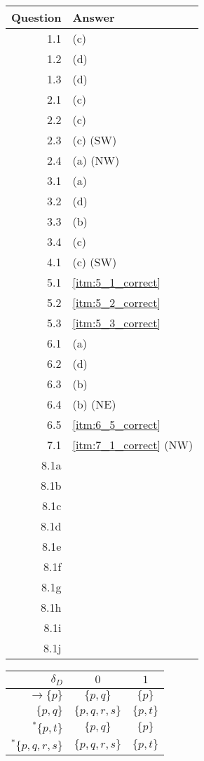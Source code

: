 \documentclass[docid=2012]{tcom_test1}
\begin{document}
\renewcommand\thesubsubsection{\thesubsection.\arabic{subsubsection}}
\setcounter{chapter}{2011}
\begin{center}
\begin{tabular}{r | l}
	Question & Answer   \\ \hline
	1.1      & (c)      \\
	1.2      & (d)      \\
	1.3      & (d)      \\ \hline
	2.1      & (c)      \\
	2.2      & (c)      \\
	2.3      & (c) (SW) \\
	2.4      & (a) (NW) \\ \hline
	3.1      & (a)      \\
	3.2      & (d)      \\
	3.3      & (b)      \\
	3.4      & (c)      \\ \hline
	4.1      & (c) (SW) \\ \hline
	5.1      & \ref{itm:5_1_correct} \\
	5.2      & \ref{itm:5_2_correct} \\
	5.3      & \ref{itm:5_3_correct} \\ \hline
	6.1      & (a)      \\
	6.2      & (d)      \\
	6.3      & (b)      \\
	6.4      & (b) (NE) \\
	6.5      & \ref{itm:6_5_correct} \\ \hline
	7.1      & \ref{itm:7_1_correct} (NW) \\ \hline
	8.1a     &          \\
	8.1b     &          \\
	8.1c     &          \\
	8.1d     &          \\
	8.1e     &          \\
	8.1f     &          \\
	8.1g     &          \\
	8.1h     &          \\
	8.1i     &          \\
	8.1j     &          
\end{tabular}
\end{center}
\setcounter{subsection}{3}
\begin{center}
\begin{tabular}{r | c c}
	$\delta_D                 $ & $0          $ & $1      $ \\ \hline
	$\rightarrow \{p        \}$ & $\{p,q    \}$ & $\{p  \}$ \\
	$            \{p,q      \}$ & $\{p,q,r,s\}$ & $\{p,t\}$ \\
	$       ^*\{p,      t\}$ & $\{p,q    \}$ & $\{p  \}$ \\
	$       ^*\{p,q,r,s  \}$ & $\{p,q,r,s\}$ & $\{p,t\}$
\end{tabular}
\end{center}
\end{document}
